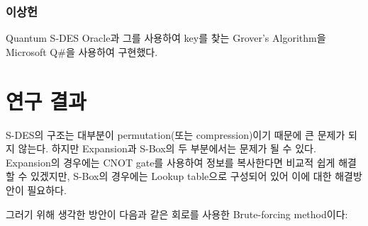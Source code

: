 \documentclass{article}
\theoremstyle{break}
\begin{document}
	\subsubsection{이상헌}
	
	Quantum S-DES Oracle과 그를 사용하여 key를 찾는 Grover's Algorithm을 Microsoft Q\#을 사용하여 구현했다.
	
	\section{연구 결과}
	
	S-DES의 구조는 대부분이 permutation(또는 compression)이기 때문에 큰 문제가 되지 않는다. 하지만 Expansion과 S-Box의 두 부분에서는 문제가 될 수 있다. Expansion의 경우에는 CNOT gate를 사용하여 정보를 복사한다면 비교적 쉽게 해결할 수 있겠지만, S-Box의 경우에는 Lookup table으로 구성되어 있어 이에 대한 해결방안이 필요하다.
	
	그러기 위해 생각한 방안이 다음과 같은 회로를 사용한 Brute-forcing method이다:
	
	\begin{center}
	\end{center}
	
\end{document}
